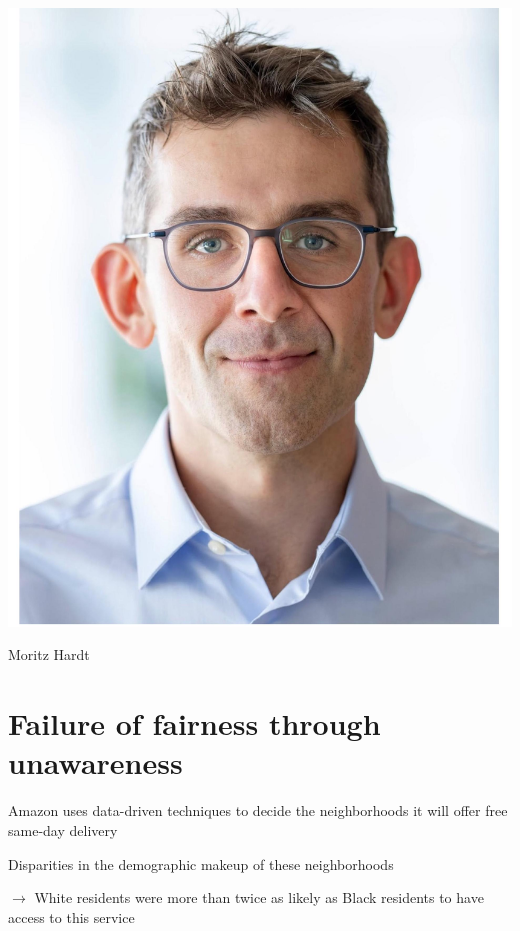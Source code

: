 \documentclass[10pt]{article}
\begin{document}
\begin{center}
\includegraphics[max width=\textwidth]{2024_01_08_7c1a383b1e6170f910e4g-03}
\end{center}

Moritz Hardt

\section*{Failure of fairness through unawareness}
Amazon uses data-driven techniques to decide the neighborhoods it will offer free same-day delivery

Disparities in the demographic makeup of these neighborhoods

$\rightarrow$ White residents were more than twice as likely as Black residents to have access to this service
\end{document}
